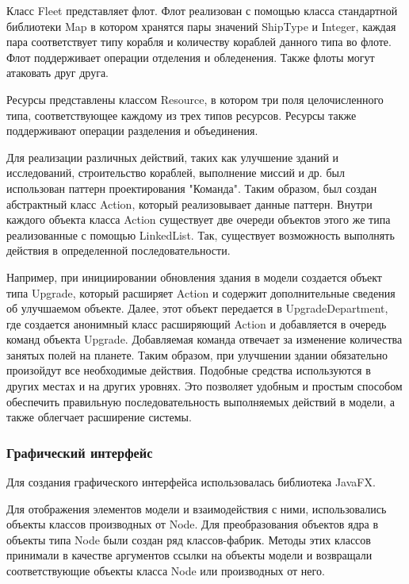 Класс Fleet представляет флот. Флот реализован с помощью класса стандартной библиотеки Map в котором хранятся пары значений ShipType и Integer, каждая пара соответствует типу корабля и количеству кораблей данного типа во флоте. Флот поддерживает операции отделения и обледенения. Также флоты могут атаковать друг друга.

Ресурсы представлены классом Resource, в котором три поля целочисленного типа, соответствующее каждому из трех типов ресурсов. Ресурсы также поддерживают операции разделения и объединения.

Для реализации различных действий, таких как улучшение зданий и исследований, строительство кораблей, выполнение миссий и др. был использован паттерн проектирования "Команда". Таким образом, был создан абстрактный класс Action, который реализовывает данные паттерн. Внутри каждого объекта класса Action существует две очереди объектов этого же типа реализованные с помощью LinkedList. Так, существует возможность выполнять действия в определенной последовательности. 

Например, при инициировании обновления здания в модели создается объект типа Upgrade, который расширяет Action и содержит дополнительные сведения об улучшаемом объекте. Далее, этот объект передается в UpgradeDepartment, где создается анонимный класс расширяющий Action и добавляется в очередь команд объекта Upgrade. Добавляемая команда отвечает за изменение количества занятых полей на планете. Таким образом, при улучшении здании обязательно произойдут все необходимые действия. Подобные средства используются в других местах и на других уровнях. Это позволяет удобным и простым способом обеспечить правильную последовательность выполняемых действий в модели, а также облегчает расширение системы.     

\subsubsection{Графический интерфейс}

Для создания графического интерфейса использовалась библиотека JavaFX.  

Для отображения элементов модели и взаимодействия с ними, использовались объекты классов производных от Node. Для преобразования объектов ядра в объекты типа Node были создан ряд классов-фабрик. Методы этих классов принимали в качестве аргументов ссылки на объекты модели и возвращали соответствующие объекты класса Node или производных от него.

